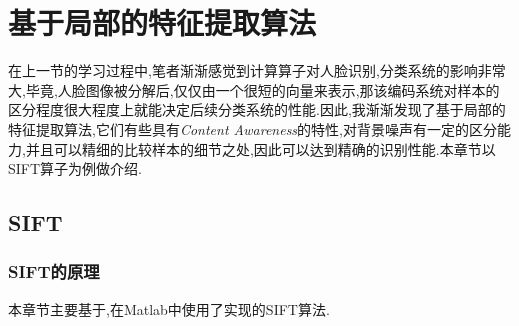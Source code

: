\chapter{基于局部的特征提取算法}
\label{cha:local}
在上一节的学习过程中,笔者渐渐感觉到计算算子对人脸识别,分类系统的影响非常大,毕竟,人脸图像被分解后,仅仅由一个很短的向量来表示,那该编码系统对样本的区分程度很大程度上就能决定后续分类系统的性能.因此,我渐渐发现了基于局部的特征提取算法,它们有些具有\textit{Content Awareness}的特性,对背景噪声有一定的区分能力,并且可以精细的比较样本的细节之处,因此可以达到精确的识别性能.本章节以SIFT算子为例做介绍.

\section{SIFT}
\subsection{SIFT的原理}
本章节主要基于\cite{lowe2004distinctive, issolah2013sift, juan2009comparison, siftopencv, siftvlfeat, siftubc,lowe1999object},在Matlab中使用了\cite{siftvlfeat}实现的SIFT算法. \newline

